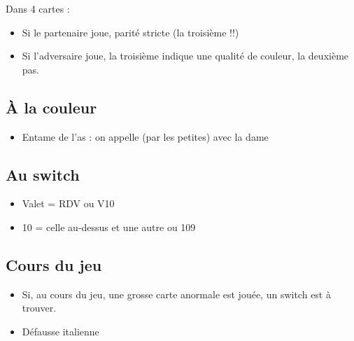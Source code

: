 \documentclass[a4paper]{article}
\begin{document}
Dans 4 cartes :

\begin{itemize}
\item Si le partenaire joue, parité stricte (la troisième !!)

\end{itemize}

\begin{itemize}
\item Si l'adversaire joue, la troisième indique une qualité de couleur, la deuxième pas.

\end{itemize}

\subsection{À la couleur}

\begin{itemize}
\item Entame de l'as : on appelle (par les petites) avec la dame

\end{itemize}

\subsection{Au switch}

\begin{itemize}
\item Valet = RDV ou V10

\end{itemize}

\begin{itemize}
\item 10 = celle au-dessus et une autre ou 109

\end{itemize}

\subsection{Cours du jeu}

\begin{itemize}
\item Si, au cours du jeu, une grosse carte anormale est jouée, un switch est à trouver.

\end{itemize}

\begin{itemize}
\item Défausse italienne

\end{itemize}
\end{document}
